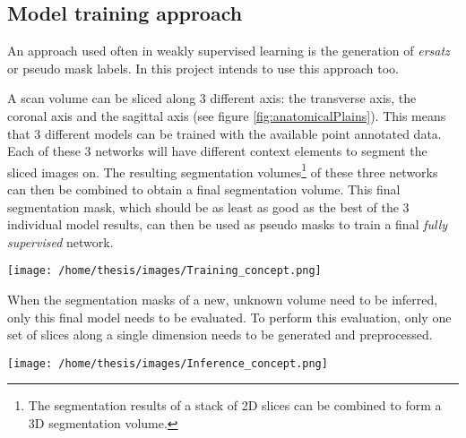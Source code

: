 \subsection{Model training approach}

An approach used often in weakly supervised learning is the generation of \textit{ersatz} or pseudo mask labels.
In this project intends to use this approach too.

A scan volume can be sliced along 3 different axis: the transverse axis, the coronal axis and the sagittal axis (see figure \ref{fig:anatomicalPlains}). 
This means that 3 different models can be trained with the available point annotated data. 
Each of these 3 networks will have different context elements to segment the sliced images on.
The resulting segmentation volumes\footnote{The segmentation results of a stack of 2D slices can be combined to form a 3D segmentation volume.} of these three networks can then be combined to obtain a final segmentation volume.
This final segmentation mask, which should be as least as good as the best of the 3 individual model results, can then be used as pseudo masks to train a final \textit{fully supervised} network. 

\begin{SCfigure}[][htb]
    \centering
    \texttt{[image: /home/thesis/images/Training\_concept.png]}
    \caption{\label{fig:model_training_concept}Illustration of the model training approach. 
    This is based on the conbination of 3 different models based on different volume slices.}
\end{SCfigure}

When the segmentation masks of a new, unknown volume need to be inferred, only this final model needs to be evaluated.
To perform this evaluation, only one set of slices along a single dimension needs to be generated and preprocessed.

\begin{SCfigure}[][htb]
    \centering
    \texttt{[image: /home/thesis/images/Inference\_concept.png]}
    \caption{Inference step. Only one model needs to be evaluated in this step, the model that is trianed in the final step of the training procedure illustrated in figure \ref{fig:model_training_concept}.}
\end{SCfigure}
